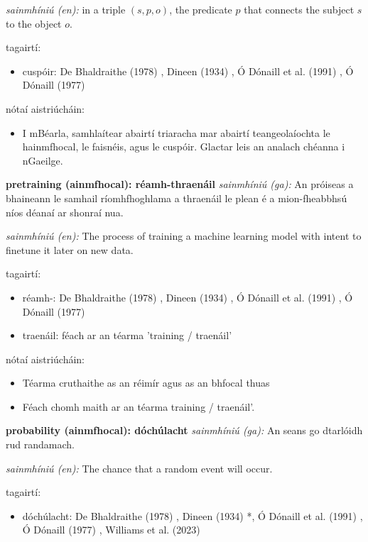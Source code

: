 \documentclass{article}
\begin{document}
\textit{sainmhíniú (en):} in a triple $(s,p,o)$, the predicate $p$ that connects the subject $s$ to the object $o$.

tagairtí:
\begin{itemize}
	\item cuspóir: De Bhaldraithe (1978) \cite{de-bhaldraithe}, Dineen (1934) \cite{dineen}, Ó Dónaill et al. (1991) \cite{focloir-beag}, Ó Dónaill (1977) \cite{odonaill}
\end{itemize}

nótaí aistriúcháin:
\begin{itemize}
	\item I mBéarla, samhlaítear abairtí triaracha mar abairtí teangeolaíochta le hainmfhocal, le faisnéis, agus le cuspóir. Glactar leis an analach chéanna i nGaeilge.
\end{itemize}


\textbf{pretraining (ainmfhocal): réamh-thraenáil}
\textit{sainmhíniú (ga):} An próiseas a bhaineann le samhail ríomhfhoghlama a thraenáil le plean é a mion-fheabbhsú níos déanaí ar shonraí nua.

\textit{sainmhíniú (en):} The process of training a machine learning model with intent to finetune it later on new data.

tagairtí:
\begin{itemize}
	\item réamh-: De Bhaldraithe (1978) \cite{de-bhaldraithe}, Dineen (1934) \cite{dineen}, Ó Dónaill et al. (1991) \cite{focloir-beag}, Ó Dónaill (1977) \cite{odonaill}
	\item traenáil: féach ar an téarma 'training / traenáil'
\end{itemize}

nótaí aistriúcháin:
\begin{itemize}
	\item Téarma cruthaithe as an réimír agus as an bhfocal thuas
	\item Féach chomh maith ar an téarma training / traenáil'.
\end{itemize}


\textbf{probability (ainmfhocal): dóchúlacht}
\textit{sainmhíniú (ga):} An seans go dtarlóidh rud randamach.

\textit{sainmhíniú (en):} The chance that a random event will occur.

tagairtí:
\begin{itemize}
	\item dóchúlacht: De Bhaldraithe (1978) \cite{de-bhaldraithe}, Dineen (1934) \cite{dineen}*, Ó Dónaill et al. (1991) \cite{focloir-beag}, Ó Dónaill (1977) \cite{odonaill}, Williams et al. (2023) \cite{storchiste}
\end{itemize}
\end{document}
